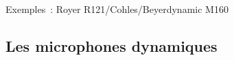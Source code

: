\documentclass[
  letterpaper,
  DIV=11,
  numbers=noendperiod]{scrreprt}
\begin{document}
Exemples~: Royer R121/Cohles/Beyerdynamic M160

\hypertarget{les-microphones-dynamiques}{%
\subsection{Les microphones
dynamiques}\label{les-microphones-dynamiques}}

\begin{figure}

\begin{minipage}[t]{0.33\linewidth}

{\centering 


}

\end{minipage}%
%
\begin{minipage}[t]{0.33\linewidth}

{\centering 

\raisebox{-\height}{

}}
\end{minipage}
\end{figure}
\end{document}
